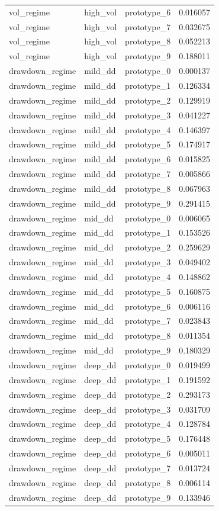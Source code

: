 \begin{tabular}{lllr}
vol\_regime & high\_vol & prototype\_6 & 0.016057 \\
vol\_regime & high\_vol & prototype\_7 & 0.032675 \\
vol\_regime & high\_vol & prototype\_8 & 0.052213 \\
vol\_regime & high\_vol & prototype\_9 & 0.188011 \\
drawdown\_regime & mild\_dd & prototype\_0 & 0.000137 \\
drawdown\_regime & mild\_dd & prototype\_1 & 0.126334 \\
drawdown\_regime & mild\_dd & prototype\_2 & 0.129919 \\
drawdown\_regime & mild\_dd & prototype\_3 & 0.041227 \\
drawdown\_regime & mild\_dd & prototype\_4 & 0.146397 \\
drawdown\_regime & mild\_dd & prototype\_5 & 0.174917 \\
drawdown\_regime & mild\_dd & prototype\_6 & 0.015825 \\
drawdown\_regime & mild\_dd & prototype\_7 & 0.005866 \\
drawdown\_regime & mild\_dd & prototype\_8 & 0.067963 \\
drawdown\_regime & mild\_dd & prototype\_9 & 0.291415 \\
drawdown\_regime & mid\_dd & prototype\_0 & 0.006065 \\
drawdown\_regime & mid\_dd & prototype\_1 & 0.153526 \\
drawdown\_regime & mid\_dd & prototype\_2 & 0.259629 \\
drawdown\_regime & mid\_dd & prototype\_3 & 0.049402 \\
drawdown\_regime & mid\_dd & prototype\_4 & 0.148862 \\
drawdown\_regime & mid\_dd & prototype\_5 & 0.160875 \\
drawdown\_regime & mid\_dd & prototype\_6 & 0.006116 \\
drawdown\_regime & mid\_dd & prototype\_7 & 0.023843 \\
drawdown\_regime & mid\_dd & prototype\_8 & 0.011354 \\
drawdown\_regime & mid\_dd & prototype\_9 & 0.180329 \\
drawdown\_regime & deep\_dd & prototype\_0 & 0.019499 \\
drawdown\_regime & deep\_dd & prototype\_1 & 0.191592 \\
drawdown\_regime & deep\_dd & prototype\_2 & 0.293173 \\
drawdown\_regime & deep\_dd & prototype\_3 & 0.031709 \\
drawdown\_regime & deep\_dd & prototype\_4 & 0.128784 \\
drawdown\_regime & deep\_dd & prototype\_5 & 0.176448 \\
drawdown\_regime & deep\_dd & prototype\_6 & 0.005011 \\
drawdown\_regime & deep\_dd & prototype\_7 & 0.013724 \\
drawdown\_regime & deep\_dd & prototype\_8 & 0.006114 \\
drawdown\_regime & deep\_dd & prototype\_9 & 0.133946 \\
\bottomrule
\end{tabular}
